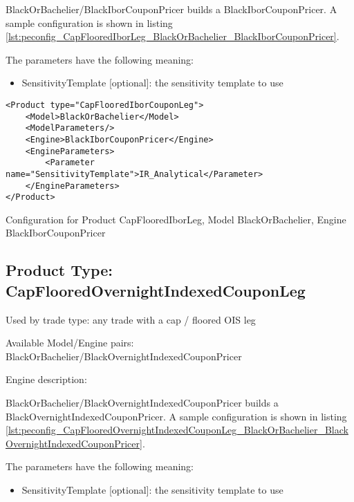 BlackOrBachelier/BlackIborCouponPricer builds a BlackIborCouponPricer. A sample configuration is
shown in listing \ref{lst:peconfig_CapFlooredIborLeg_BlackOrBachelier_BlackIborCouponPricer}.

The parameters have the following meaning:

\begin{itemize}
\item SensitivityTemplate [optional]: the sensitivity template to use 
\end{itemize}

\begin{longlisting}
\begin{verbatim}
<Product type="CapFlooredIborCouponLeg">
    <Model>BlackOrBachelier</Model>
    <ModelParameters/>
    <Engine>BlackIborCouponPricer</Engine>
    <EngineParameters>
        <Parameter name="SensitivityTemplate">IR_Analytical</Parameter>
    </EngineParameters>
</Product>
\end{verbatim}
\caption{Configuration for Product CapFlooredIborLeg, Model BlackOrBachelier, Engine BlackIborCouponPricer}
\label{lst:peconfig_CapFlooredIborLeg_BlackOrBachelier_BlackIborCouponPricer}
\end{longlisting}

\subsection{Product Type: CapFlooredOvernightIndexedCouponLeg}

Used by trade type: any trade with a cap / floored OIS leg

Available Model/Engine pairs: BlackOrBachelier/BlackOvernightIndexedCouponPricer

Engine description:

BlackOrBachelier/BlackOvernightIndexedCouponPricer builds a BlackOvernightIndexedCouponPricer. A sample configuration is
shown in listing \ref{lst:peconfig_CapFlooredOvernightIndexedCouponLeg_BlackOrBachelier_BlackOvernightIndexedCouponPricer}.

The parameters have the following meaning:

\begin{itemize}
\item SensitivityTemplate [optional]: the sensitivity template to use 
\end{itemize}

